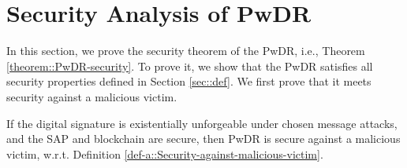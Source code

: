 
\vspace{-2.6mm}
\section{Security Analysis of  PwDR}\label{sec::proof}
\vspace{-1mm}
In this section, we prove the security theorem of the PwDR, i.e., Theorem \ref{theorem::PwDR-security}. %
%
To prove it, we show that the PwDR satisfies all security properties defined in Section \ref{sec::def}. We first prove that it meets security against a malicious victim. 

\vspace{-1.5mm}
\begin{lemma}\label{lemma::secure-against-a-malicious-victim} If the digital signature is existentially unforgeable under chosen message attacks, and the SAP and blockchain are secure, then PwDR is secure against a malicious victim, w.r.t. Definition \ref{def-a::Security-against-malicious-victim}. 
\end{lemma}


